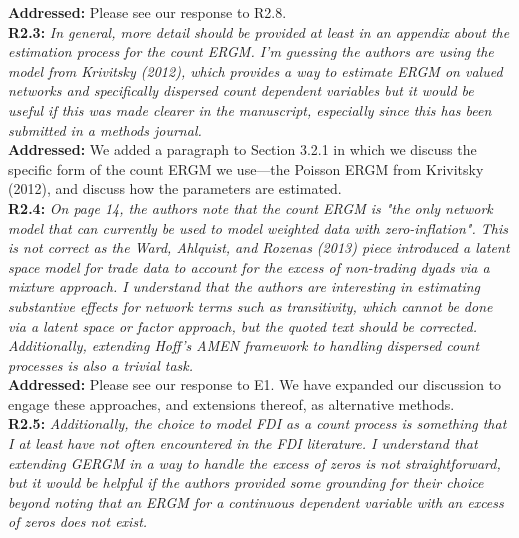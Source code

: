 \documentclass[a4paper,11pt]{texMemo}
\begin{document}
\noindent \textbf{Addressed:} Please see our response to R2.8. \\

\noindent \textbf{R2.3:} \emph{In general, more detail should be provided at least in an appendix about the estimation process for the count ERGM. I'm guessing the authors are using the model from Krivitsky (2012), which provides a way to estimate ERGM on valued networks and specifically dispersed count dependent variables but it would be useful if this was made clearer in the manuscript, especially since this has been submitted in a methods journal.}\\

\noindent \textbf{Addressed:} We added a paragraph to Section 3.2.1 in which we discuss the specific form of the count ERGM we use---the Poisson ERGM from Krivitsky (2012), and discuss how the parameters are estimated. \\

\noindent \textbf{R2.4:} \emph{On page 14, the authors note that the count ERGM is "the only network model that can currently be used to model weighted data with zero-inflation". This is not correct as the Ward, Ahlquist, and Rozenas (2013) piece introduced a latent space model for trade data to account for the excess of non-trading dyads via a mixture approach. I understand that the authors are interesting in estimating substantive effects for network terms such as transitivity, which cannot be done via a latent space or factor approach, but the quoted text should be corrected. Additionally, extending Hoff's AMEN framework to handling dispersed count processes is also a trivial task.}\\

\noindent \textbf{Addressed:} Please see our response to E1. We have expanded our discussion to engage these approaches, and extensions thereof, as alternative methods.\\

\noindent \textbf{R2.5:} \emph{Additionally, the choice to model FDI as a count process is something that I at least have not often encountered in the FDI literature. I understand that extending GERGM in a way to handle the excess of zeros is not straightforward, but it would be helpful if the authors provided some grounding for their choice beyond noting that an ERGM for a continuous dependent variable with an excess of zeros does not exist.}\\
\end{document}
